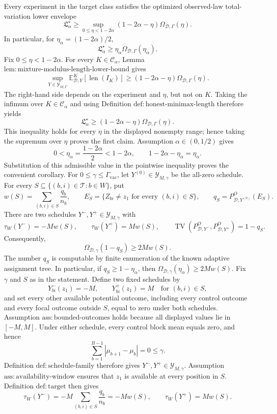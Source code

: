 Every experiment in the target class satisfies the optimized observed-law total-variation lower envelope
\[
 \mathfrak L_\alpha^\star
 \ge
 \sup_{0\le\eta<1-2\alpha}
 (1-2\alpha-\eta)\Omega_{\mathcal D,\Gamma}(\eta).
\]
In particular, for \(\eta_\alpha=(1-2\alpha)/2\),
\[
 \mathfrak L_\alpha^\star
 \ge \eta_\alpha\Omega_{\mathcal D,\Gamma}(\eta_\alpha).
\]
Fix \(0\le\eta<1-2\alpha\).  For every \(K\in\mathcal C_\alpha\), Lemma \(\mathrm{lem:mixture\text{-}modulus\text{-}length\text{-}lower\text{-}bound}\) gives
\[
 \sup_{Y\in\mathcal Y_{M,\Gamma}}
 \mathbb E^K_{\mathcal D,Y}[\operatorname{len}(I_K)]
 \ge
 (1-2\alpha-\eta)\Omega_{\mathcal D,\Gamma}(\eta).
\]
The right-hand side depends on the experiment and \(\eta\), but not on \(K\).  Taking the infimum over \(K\in\mathcal C_\alpha\) and using Definition \(\mathrm{def:honest\text{-}minimax\text{-}length}\) therefore yields
\[
 \mathfrak L_\alpha^\star
 \ge
 (1-2\alpha-\eta)\Omega_{\mathcal D,\Gamma}(\eta).
\]
This inequality holds for every \(\eta\) in the displayed nonempty range; hence taking the supremum over \(\eta\) proves the first claim.  Assumption \(\alpha\in(0,1/2)\) gives
\[
 0<\eta_\alpha=\frac{1-2\alpha}{2}<1-2\alpha,
 \qquad
 1-2\alpha-\eta_\alpha=\eta_\alpha.
\]
Substitution of this admissible value in the pointwise inequality proves the convenient corollary.
For \(0\le\gamma\le\Gamma_{\mathrm{vac}}\), let \(Y^{(0)}\in\mathcal Y_{M,\gamma}\) be the all-zero schedule.  For every \(S\subseteq\{(b,i)\in\mathcal T:b\in W\}\), put
\[
 w(S)=\sum_{(b,i)\in S}\frac{q_b}{n_b},
 \qquad
 E_S=\{Z_{bi}\ne z_1\text{ for every }(b,i)\in S\},
 \qquad
 q_S=P^O_{\mathcal D,Y^{(0)}}(E_S).
\]
There are two schedules \(Y^-,Y^+\in\mathcal Y_{M,\gamma}\) with
\[
 \tau_W(Y^-)=-Mw(S),
 \qquad
 \tau_W(Y^+)=Mw(S),
 \qquad
 \operatorname{TV}\!\left(P^O_{\mathcal D,Y^-},P^O_{\mathcal D,Y^+}\right)=1-q_S.
\]
Consequently,
\[
 \Omega_{\mathcal D,\gamma}(1-q_S)\ge2Mw(S).
\]
The number \(q_S\) is computable by finite enumeration of the known adaptive assignment tree.  In particular, if \(q_S\ge1-\eta_\alpha\), then \(\Omega_{\mathcal D,\gamma}(\eta_\alpha)\ge2Mw(S)\).
Fix \(\gamma\) and \(S\) as in the statement.  Define two fixed schedules by
\[
 Y^-_{bi}(z_1)=-M,
 \qquad
 Y^+_{bi}(z_1)=M
 \quad\text{for }(b,i)\in S,
\]
and set every other available potential outcome, including every control outcome and every focal outcome outside \(S\), equal to zero under both schedules.  Assumption \(\mathrm{ass:bounded\text{-}outcomes}\) holds because all displayed values lie in \([-M,M]\).  Under either schedule, every control block mean equals zero, and hence
\[
 \sum_{b=1}^{B-1}|\mu_{b+1}-\mu_b|=0\le\gamma.
\]
Definition \(\mathrm{def:schedule\text{-}family}\) therefore gives \(Y^-,Y^+\in\mathcal Y_{M,\gamma}\).  Assumption \(\mathrm{ass:availability\text{-}window}\) ensures that \(z_1\) is available at every position in \(S\).  Definition \(\mathrm{def:target}\) then gives
\[
 \tau_W(Y^-)=-M\sum_{(b,i)\in S}\frac{q_b}{n_b}=-Mw(S),
 \qquad
 \tau_W(Y^+)=Mw(S).
\]

